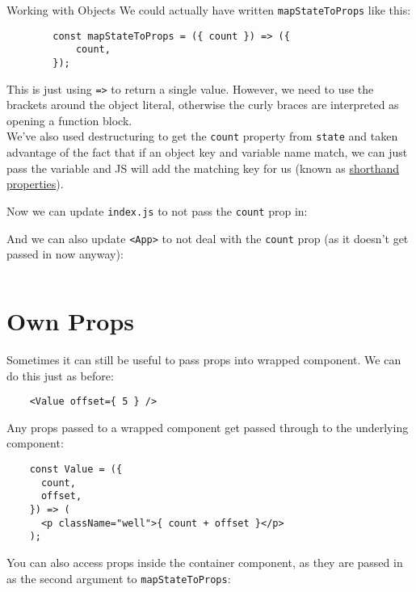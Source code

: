 \begin{infobox}{Working with Objects}
    We could actually have written \texttt{mapStateToProps} like this:

    \begin{verbatim}
        const mapStateToProps = ({ count }) => ({
            count,
        });
    \end{verbatim}

    This is just using \texttt{=>} to return a single value. However, we need to use the brackets around the object literal, otherwise the curly braces are interpreted as opening a function block.
    \\

    We've also used destructuring to get the \texttt{count} property from \texttt{state} and taken advantage of the fact that if an object key and variable name match, we can just pass the variable and JS will add the matching key for us (known as \href{https://ariya.io/2013/02/es6-and-object-literal-property-value-shorthand}{shorthand properties}).
\end{infobox}

Now we can update \texttt{index.js} to not pass the \texttt{count} prop in:


And we can also update \texttt{<App>} to not deal with the \texttt{count} prop (as it doesn't get passed in now anyway):

\inputminted{jsx}{02/figures/02/06-App.jsx}


\section{Own Props}

Sometimes it can still be useful to pass props into wrapped component. We can do this just as before:

\begin{verbatim}
    <Value offset={ 5 } />
\end{verbatim}

Any props passed to a wrapped component get passed through to the underlying component:

\begin{verbatim}
    const Value = ({
      count,
      offset,
    }) => (
      <p className="well">{ count + offset }</p>
    );
\end{verbatim}

You can also access props inside the container component, as they are passed in as the second argument to \texttt{mapStateToProps}:

